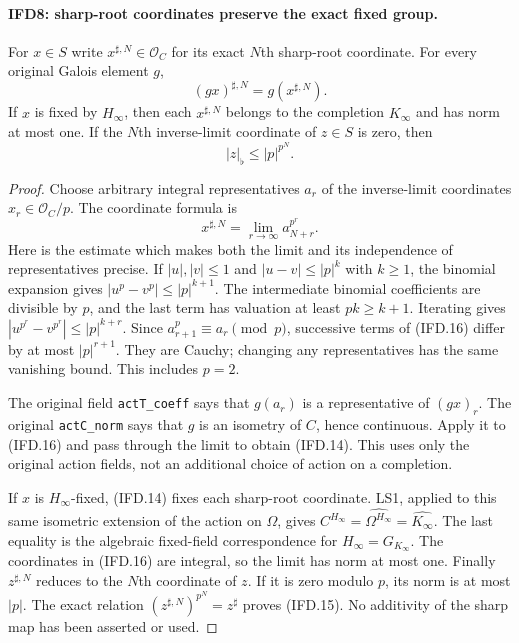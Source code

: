 \paragraph{IFD8: sharp-root coordinates preserve the exact fixed group.}
\label{claim:IFD8}
For $x\in S$ write $x^{\sharp,N}\in\mathcal O_C$ for its exact
$N$th sharp-root coordinate. For every original Galois element $g$,
\[
        (g x)^{\sharp,N}=g(x^{\sharp,N}).                    \tag{IFD.14}
\]
If $x$ is fixed by $H_\infty$, then each $x^{\sharp,N}$ belongs
to the completion $\widehat{K_\infty}$ and has norm at most one.
If the $N$th inverse-limit coordinate of $z\in S$ is zero, then
\[
                            |z|_\flat\leq |p|^{p^N}.        \tag{IFD.15}
\]

\begin{proof}
Choose arbitrary integral representatives $a_r$ of the inverse-limit
coordinates $x_r\in\mathcal O_C/p$. The coordinate formula is
\[
                 x^{\sharp,N}=\lim_{r\to\infty}a_{N+r}^{p^r}.
                                                               \tag{IFD.16}
\]
Here is the estimate which makes both the limit and its independence
of representatives precise. If $|u|,|v|\leq1$ and $|u-v|\leq|p|^k$
with $k\geq1$, the binomial expansion gives
$|u^p-v^p|\leq|p|^{k+1}$. The intermediate binomial coefficients
are divisible by $p$, and the last term has valuation at least
$pk\geq k+1$. Iterating gives
$|u^{p^r}-v^{p^r}|\leq|p|^{k+r}$.
Since $a_{r+1}^p\equiv a_r\pmod p$, successive terms of (IFD.16)
differ by at most $|p|^{r+1}$. They are Cauchy; changing any
representatives has the same vanishing bound. This includes $p=2$.

The original field \texttt{actT\_coeff} says that $g(a_r)$ is a
representative of $(gx)_r$. The original \texttt{actC\_norm} says
that $g$ is an isometry of $C$, hence continuous. Apply it to
(IFD.16) and pass through the limit to obtain (IFD.14).
This uses only the original action fields, not an additional choice
of action on a completion.

If $x$ is $H_\infty$-fixed, (IFD.14) fixes each sharp-root
coordinate. LS1, applied to this same isometric extension of the
action on $\Omega$, gives
$C^{H_\infty}=\widehat{\Omega^{H_\infty}}
=\widehat{K_\infty}$. The last equality is the algebraic
fixed-field correspondence for $H_\infty=G_{K_\infty}$.
The coordinates in (IFD.16) are integral, so the limit has norm at
most one. Finally $z^{\sharp,N}$ reduces to the $N$th coordinate
of $z$. If it is zero modulo $p$, its norm is at most $|p|$.
The exact relation $(z^{\sharp,N})^{p^N}=z^\sharp$ proves (IFD.15).
No additivity of the sharp map has been asserted or used.
\end{proof}

